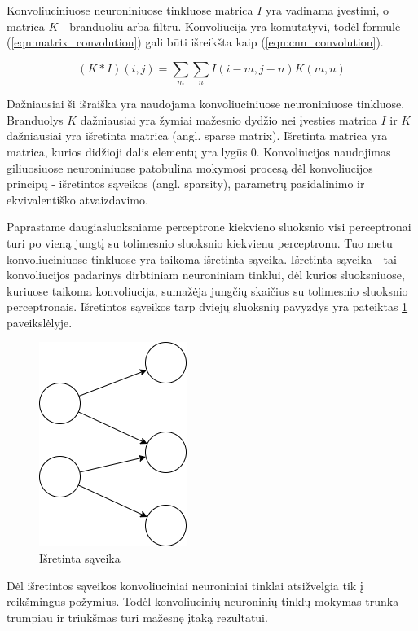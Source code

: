 Konvoliuciniuose neuroniniuose tinkluose matrica $I$ yra vadinama įvestimi, o matrica $K$ - branduoliu arba filtru. Konvoliucija yra komutatyvi, todėl formulė (\ref{eqn:matrix_convolution}) gali būti išreikšta kaip (\ref{eqn:cnn_convolution}).

\begin{equation}
\label{eqn:cnn_convolution}
	(K * I)(i, j) = \sum_{m} \sum_{n} I(i - m, j - n) K(m, n)
\end{equation}

Dažniausiai ši išraiška yra naudojama konvoliuciniuose neuroniniuose tinkluose. Branduolys $K$ dažniausiai yra žymiai mažesnio dydžio nei įvesties matrica $I$ ir $K$ dažniausiai yra išretinta matrica (angl. sparse matrix). Išretinta matrica yra matrica, kurios didžioji dalis elementų yra lygūs 0. Konvoliucijos naudojimas giliuosiuose neuroniniuose patobulina mokymosi procesą dėl konvoliucijos principų - išretintos sąveikos (angl. sparsity), parametrų pasidalinimo ir ekvivalentiško atvaizdavimo.

Paprastame daugiasluoksniame perceptrone kiekvieno sluoksnio visi perceptronai turi po vieną jungtį su tolimesnio sluoksnio kiekvienu perceptronu. Tuo metu konvoliuciniuose tinkluose yra taikoma išretinta sąveika. Išretinta sąveika - tai konvoliucijos padarinys dirbtiniam neuroniniam tinklui, dėl kurios sluoksniuose, kuriuose taikoma konvoliucija, sumažėja jungčių skaičius su tolimesnio sluoksnio perceptronais. Išretintos sąveikos tarp dviejų sluoksnių pavyzdys yra pateiktas \ref{img:sparsity} paveikslėlyje.

\begin{figure}[H]
	\centering
	\includegraphics[scale=0.5]{img/sparsity.png}
	\caption{Išretinta sąveika}
	\label{img:sparsity}
\end{figure}

Dėl išretintos sąveikos konvoliuciniai neuroniniai tinklai atsižvelgia tik į reikšmingus požymius. Todėl konvoliucinių neuroninių tinklų mokymas trunka trumpiau ir triukšmas turi mažesnę įtaką rezultatui.


